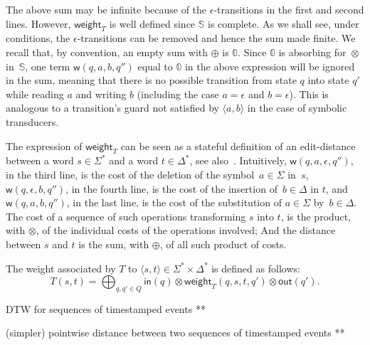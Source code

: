 \documentclass[runningheads]{llncs}
\def\<#1>{\langle #1 \rangle}
\newcommand{\Semiring}{\mathbb{S}}
\newcommand{\zero}{\mathbb{0}}
\def\weight{\mathsf{weight}}
\def\wei{\mathsf{w}}
\begin{document}
The above sum may be infinite because of the $\epsilon$-transitions in the first and second lines.
However, $\weight_T$ is well defined since $\Semiring$ is complete.
%
As we shall see, under conditions, the $\epsilon$-transitions can be removed and hence the sum made finite.
%
We recall that, by convention, an empty sum with $\oplus$ is $\zero$. 
%
Since $\zero$ is absorbing for~$\otimes$ in~$\Semiring$,
one term $\wei(q, a, b, q'')$ equal to $\zero$ in the above expression 
will be ignored in the sum, meaning that there is no possible transition
from state $q$ into state $q'$ while reading $a$ and writing $b$ 
(including the case $a = \epsilon$ and $b = \epsilon$).
This is analogous to a transition's guard not satisfied by $\<a, b>$ in 
the case of symbolic transducers.

The expression of $\weight_T$ can be seen as a stateful definition of 
an edit-distance between a word $s \in \Sigma^*$ and a word $t \in \Delta^*$,
see also~\cite{Mohri03ijfcs}.
Intuitively, 
$\wei(q, a, \epsilon, q'')$, in the third line, is the cost of 
the deletion of the symbol~$a \in \Sigma$ in~$s$, 
$\wei(q, \epsilon, b, q'')$, in the fourth line, is the cost 
of the insertion of~$b \in \Delta$ in $t$, 
and $\wei(q, a, b, q'')$, in the last line, is the cost 
of the substitution of  $a \in \Sigma$ by~$b \in \Delta$.
The cost of a sequence of such operations transforming $s$ into $t$, 
is the product, with $\otimes$, of the individual costs of the operations involved;
And the distance between $s$ and $t$ is the sum, with $\oplus$,
of all such product of costs.


\medskip\noindent
The weight associated by $T$ to  $\< s, t> \in \Sigma^* \times \Delta^*$
is defined as follows: 
\begin{equation}
T(s, t)  = 
\displaystyle\bigoplus_{q, q' \in Q} \mathsf{in}(q) 
\mathop{\otimes} \weight_T(q, s, t, q') \mathop{\otimes} \mathsf{out}(q').
\label{eq:weightT}
\end{equation}

\begin{example}
DTW for sequences of timestamped events **     
\end{example}
      
\begin{example}
(simpler) pointwise distance between two sequences of timestamped events **
\end{example}
\end{document}

